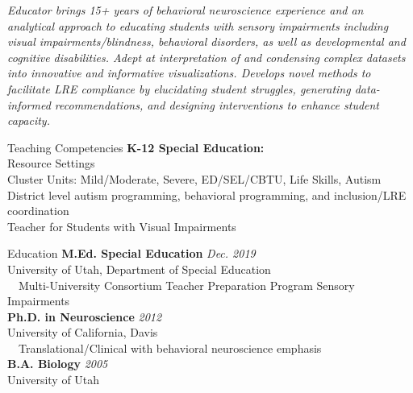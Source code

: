 \documentclass{resume} %
\begin{document}
\textit{Educator brings 15+ years of behavioral neuroscience experience and an analytical approach to educating students with sensory impairments including visual impairments/blindness, behavioral disorders, as well as developmental and cognitive disabilities. Adept at interpretation of and condensing complex datasets into innovative and informative visualizations. Develops novel methods to facilitate LRE compliance by elucidating student struggles, generating data-informed recommendations, and designing interventions to enhance student capacity.}

\begin{rSection}{Teaching Competencies}
    {\bf K-12 Special Education:} \\
    Resource Settings \\
    Cluster Units: Mild/Moderate, Severe, ED/SEL/CBTU, Life Skills, Autism \\
    District level autism programming, behavioral programming, and inclusion/LRE coordination \\
    Teacher for Students with Visual Impairments
\end{rSection}
\begin{rSection}{Education}
    {\bf M.Ed. Special Education}
    \hfill {\em Dec. 2019} \\ 
	University of Utah, Department of Special Education\\
	\textbullet~~Multi-University Consortium Teacher Preparation Program Sensory Impairments
	\\ {\bf Ph.D. in Neuroscience} \hfill {\em 2012}\\
	University of California, Davis\\
	\textbullet~~Translational/Clinical with behavioral neuroscience emphasis\\
	{\bf B.A. Biology} \hfill {\em 2005}\\ 
	University of Utah
\end{rSection}
\end{document}
